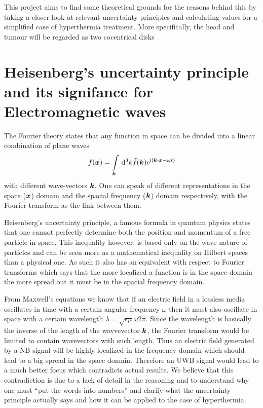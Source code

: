 \documentclass[11pt,a4paper, 
swedish,english %
]{article}
\begin{document}
This project aims to find some theoretical grounds for the reasons behind this by taking a closer look at relevant uncertainty principles and calculating values for a simplified case of hyperthermia treatment. More specifically, the head and tumour will be regarded as two cocentrical disks


\section{Heisenberg's uncertainty principle and its signifance for Electromagnetic waves}
The Fourier theory states that any function in space can be divided into a linear combination of plane waves 
\begin{equation*}
 f(\vb*x) = \int_{\vb*k}\id^3k \tilde{f}(\vb*k) \ee^{\ii( \vb*k\vdot\vb*x - \omega t)}
\end{equation*}
with different wave-vectors $\vb*k$. %
One can speak of different representations in the space ($\vb*x$) domain and the spacial frequency ($\vb*k$) domain respectively, with the Fourier transform as the link between them.

Heisenberg's uncertainty principle, a famous formula in quantum physics states that one cannot perfectly determine both the position and momentum of a free particle in space. This inequality however, is based only on the wave nature of particles and can be seen more as a mathematical inequality on Hilbert spaces than a physical one. As such it also has an equivalent with respect to Fourier transforms which says that the more localized a function is in the space domain the more spread out it must be in the spacial frequency domain.

From Maxwell's equations we know that if an electric field in a lossless media oscillates in time with a certain angular frequency $\omega$ then it  must also oscillate in space with a certain wavelength $\lambda=\sqrt{\epsilon \mu} \omega 2\pi$. Since the wavelength is basically the inverse of the length of the wavvevector $\vb*k$, the Fourier transform would be limited to contain wavevectors with such length. Thus an electric field generated by a NB signal will be highly localized in the frequency domain which should lead to a big spread in the space domain. Therefore an UWB signal would lead to a much better focus which contradicts actual results. We believe that this contradiction is due to a lack of detail in the reasoning and to understand why one must ``put the words into numbers'' and clarify what the uncertainty principle actually says and how it can be applied to the case of hyperthermia.
\end{document}
